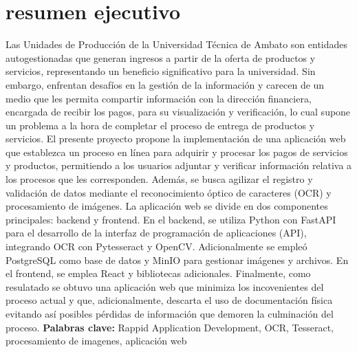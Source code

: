 \chapter*{resumen ejecutivo}
Las Unidades de Producción de la Universidad Técnica de Ambato son entidades
autogestionadas que generan ingresos a partir de la oferta de productos y servicios, 
representando un beneficio significativo para la universidad. Sin embargo, enfrentan desafíos en la
gestión de la información y carecen de
un medio que les permita compartir información con la dirección financiera, encargada de
recibir los pagos, para su visualización y verificación, lo cual supone un problema a la
hora de completar el proceso de entrega de productos y servicios.
\bigbreak
El presente proyecto propone la implementación de una aplicación web que establezca un 
proceso en línea para adquirir y procesar los pagos de servicios y productos, 
permitiendo a los usuarios adjuntar y verificar información relativa a los 
procesos que les corresponden. Además, se busca agilizar el registro y 
validación de datos mediante el reconocimiento óptico de caracteres (OCR) y 
procesamiento de imágenes.
\bigbreak
La aplicación web se divide en dos componentes principales: backend y frontend. En el 
backend, se utiliza Python con FastAPI para el desarrollo de la interfaz de programación de aplicaciones 
(API), integrando OCR con Pytesseract y OpenCV. 
Adicionalmente se empleó PostgreSQL como base de datos y MinIO para gestionar imágenes y archivos. 
En el frontend, se emplea React y bibliotecas adicionales.
\bigbreak
Finalmente, como resulatado se obtuvo una aplicación web que minimiza los incovenientes del proceso
actual y que, adicionalmente, descarta el uso de documentación física evitando así posibles pérdidas de
información que demoren la culminación del proceso.
\vfill
\textbf{Palabras clave:} Rappid Application Development, OCR, Tesseract, procesamiento de imagenes, aplicación web
